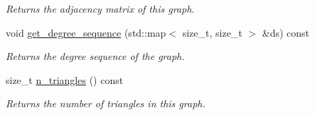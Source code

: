 \begin{DoxyCompactItemize}
\begin{DoxyCompactList}\small\item\em Returns the adjacency matrix of this graph. \end{DoxyCompactList}\item 
void \hyperlink{classlgraph_1_1xxgraph_a5b21b51f5f9c55c05c0e8e5bc836bf87}{get\+\_\+degree\+\_\+sequence} (std\+::map$<$ size\+\_\+t, size\+\_\+t $>$ \&ds) const
\begin{DoxyCompactList}\small\item\em Returns the degree sequence of the graph. \end{DoxyCompactList}\item 
size\+\_\+t \hyperlink{classlgraph_1_1xxgraph_a90a9b60caf18179576af61dc962b95e3}{n\+\_\+triangles} () const
\begin{DoxyCompactList}\small\item\em Returns the number of triangles in this graph. \end{DoxyCompactList}\end{DoxyCompactItemize}
